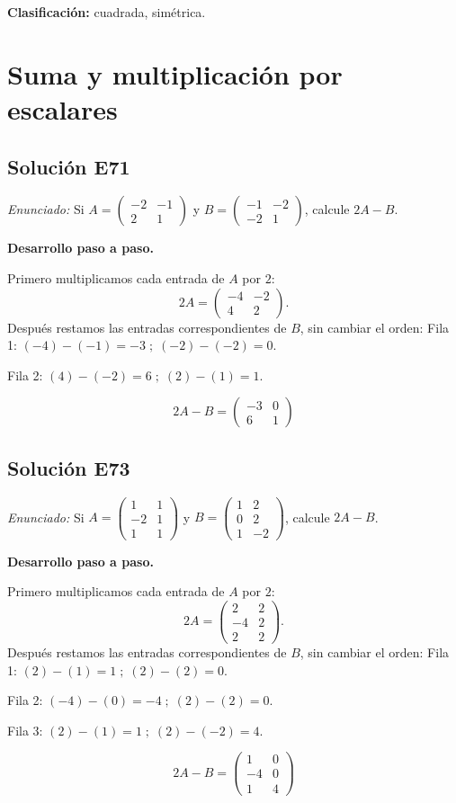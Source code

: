 \documentclass[12pt]{article}
\theoremstyle{remark}
\newcommand{\solucion}[2]{\Needspace{11\baselineskip}\subsection*{Solución E#1}\noindent\textit{Enunciado:} #2\par\medskip\noindent\textbf{Desarrollo paso a paso.}\par\medskip}
\begin{document}
\textbf{Clasificación:} cuadrada, simétrica.


\medskip

\section{Suma y multiplicación por escalares}

\solucion{71}{Si $A=\begin{pmatrix}-2&-1\\2&1\end{pmatrix}$ y $B=\begin{pmatrix}-1&-2\\-2&1\end{pmatrix}$, calcule $2A-B$.}
Primero multiplicamos cada entrada de $A$ por $2$:
\[
2A=\begin{pmatrix}-4&-2\\4&2\end{pmatrix}.
\]
Después restamos las entradas correspondientes de $B$, sin cambiar el orden:
Fila 1: $(-4)-(-1)=-3\; ;\; (-2)-(-2)=0$.

Fila 2: $(4)-(-2)=6\; ;\; (2)-(1)=1$.

\[
\boxed{2A-B=\begin{pmatrix}-3&0\\6&1\end{pmatrix}}
\]

\medskip

\solucion{73}{Si $A=\begin{pmatrix}1&1\\-2&1\\1&1\end{pmatrix}$ y $B=\begin{pmatrix}1&2\\0&2\\1&-2\end{pmatrix}$, calcule $2A-B$.}
Primero multiplicamos cada entrada de $A$ por $2$:
\[
2A=\begin{pmatrix}2&2\\-4&2\\2&2\end{pmatrix}.
\]
Después restamos las entradas correspondientes de $B$, sin cambiar el orden:
Fila 1: $(2)-(1)=1\; ;\; (2)-(2)=0$.

Fila 2: $(-4)-(0)=-4\; ;\; (2)-(2)=0$.

Fila 3: $(2)-(1)=1\; ;\; (2)-(-2)=4$.

\[
\boxed{2A-B=\begin{pmatrix}1&0\\-4&0\\1&4\end{pmatrix}}
\]
\end{document}
